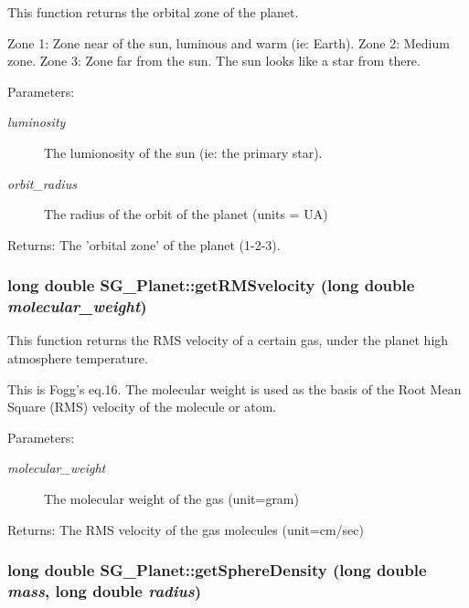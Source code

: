This function returns the orbital zone of the planet. 

Zone 1: Zone near of the sun, luminous and warm (ie: Earth). Zone 2: Medium zone. Zone 3: Zone far from the sun. The sun looks like a star from there. \begin{Desc}
\item[Parameters:]
\begin{description}
\item[{\em luminosity}]The lumionosity of the sun (ie: the primary star). \item[{\em orbit\_\-radius}]The radius of the orbit of the planet (units = UA) \end{description}
\end{Desc}
\begin{Desc}
\item[Returns:]The 'orbital zone' of the planet (1-2-3). \end{Desc}
\subsubsection{\setlength{\rightskip}{0pt plus 5cm}long double SG\_\-Planet::get\-RMSvelocity (long double {\em molecular\_\-weight})\hspace{0.3cm}{\tt  [protected]}}\label{class_s_g___planet_b29}


This function returns the RMS velocity of a certain gas, under the planet high atmosphere temperature. 

This is Fogg's eq.16. The molecular weight is used as the basis of the Root Mean Square (RMS) velocity of the molecule or atom. \begin{Desc}
\item[Parameters:]
\begin{description}
\item[{\em molecular\_\-weight}]The molecular weight of the gas (unit=gram) \end{description}
\end{Desc}
\begin{Desc}
\item[Returns:]The RMS velocity of the gas molecules (unit=cm/sec) \end{Desc}
\subsubsection{\setlength{\rightskip}{0pt plus 5cm}long double SG\_\-Planet::get\-Sphere\-Density (long double {\em mass}, long double {\em radius})\hspace{0.3cm}{\tt  [protected]}}\label{class_s_g___planet_b35}


